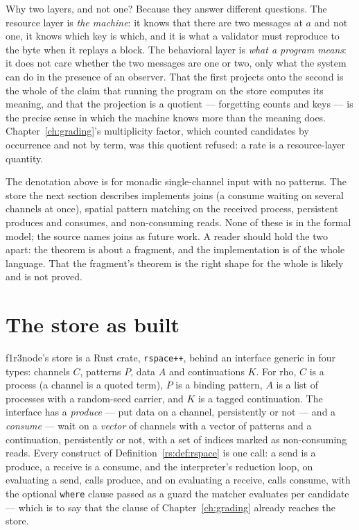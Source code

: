 Why two layers, and not one? Because they answer different questions. The resource layer
is \emph{the machine}: it knows that there are two messages at $a$ and not one, it knows
which key is which, and it is what a validator must reproduce to the byte when it replays a
block. The behavioral layer is \emph{what a program means}: it does not care whether the
two messages are one or two, only what the system can do in the presence of an observer.
That the first projects onto the second is the whole of the claim that running the program
on the store computes its meaning, and that the projection is a quotient --- forgetting
counts and keys --- is the precise sense in which the machine knows more than the meaning
does. Chapter~\ref{ch:grading}'s multiplicity factor, which counted candidates by occurrence
and not by term, was this quotient refused: a rate is a resource-layer quantity.

\begin{remark}
\label{rs:rmk:gap}
The denotation above is for monadic single-channel input with no patterns. The store the
next section describes implements joins (a consume waiting on several channels at once),
spatial pattern matching on the received process, persistent produces and consumes, and
non-consuming reads. None of these is in the formal model; the source names joins as
future work. A reader should hold the two apart: the theorem is about a fragment, and the
implementation is of the whole language. That the fragment's theorem is the right shape
for the whole is likely and is not proved.
\end{remark}

\section{The store as built}
\label{rs:sec:built}

f1r3node's store is a Rust crate, \texttt{rspace++}, behind an interface generic in four
types: channels $C$, patterns $P$, data $A$ and continuations $K$. For rho, $C$ is a
process (a channel is a quoted term), $P$ is a binding pattern, $A$ is a list of processes
with a random-seed carrier, and $K$ is a tagged continuation. The interface has a
\emph{produce} --- put data on a channel, persistently or not --- and a \emph{consume} ---
wait on a \emph{vector} of channels with a vector of patterns and a continuation,
persistently or not, with a set of indices marked as non-consuming reads. Every construct of
Definition~\ref{rs:def:rspace} is one call: a send is a produce, a receive is a consume,
and the interpreter's reduction loop, on evaluating a send, calls produce, and on
evaluating a receive, calls consume, with the optional \texttt{where} clause passed as a
guard the matcher evaluates per candidate --- which is to say that the clause of
Chapter~\ref{ch:grading} already reaches the store.

